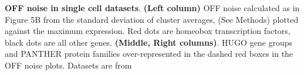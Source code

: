 \textbf{OFF noise in single cell datasets}. \textbf{(Left column)} OFF noise calculated as in Figure 5B from the standard deviation of cluster averages, (See Methods) plotted against the maximum expression. Red dots are homeobox transcription factors, black dots are all other genes. \textbf{(Middle, Right columns)}. HUGO gene groups and PANTHER protein families over-represented in the dashed red boxes in the OFF noise plots. %
Datasets are from \citep{Zeisel_2015,Tasic_2016,Zeisel_2018,Saunders_2018,Tasic_2018}